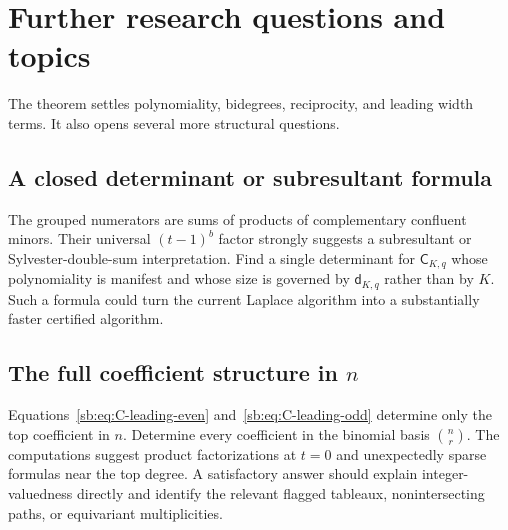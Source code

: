 \documentclass[11pt]{article}
\theoremstyle{definition}
\theoremstyle{remark}
\newcommand{\Cblock}{\mathsf C}
\newcommand{\dq}{\mathsf d}
\theoremstyle{definition}
\theoremstyle{plain}
\numberwithin{equation}{section}
\begin{document}
\section{Further research questions and topics}
\label{sb:sec:further}
The theorem settles polynomiality, bidegrees, reciprocity, and leading width
terms.  It also opens several more structural questions.


\subsection{A closed determinant or subresultant formula}
\label{sb:q:subresultant}
The grouped numerators are sums of products of complementary confluent
minors.  Their universal $(t-1)^b$ factor strongly suggests a subresultant or
Sylvester-double-sum interpretation.  Find a single determinant for
$\Cblock_{K,q}$ whose polynomiality is manifest and whose size is governed by
$\dq_{K,q}$ rather than by $K$.  Such a formula could turn the current
Laplace algorithm into a substantially faster certified algorithm.

\subsection{The full coefficient structure in \texorpdfstring{$n$}{n}}
\label{sb:q:coefficients}
Equations~\eqref{sb:eq:C-leading-even} and~\eqref{sb:eq:C-leading-odd} determine only
the top coefficient in $n$.  Determine every coefficient in the binomial
basis $\binom nr$.  The computations suggest product factorizations at
$t=0$ and unexpectedly sparse formulas near the top degree.  A satisfactory
answer should explain integer-valuedness directly and identify the relevant
flagged tableaux, nonintersecting paths, or equivariant multiplicities.
\end{document}
